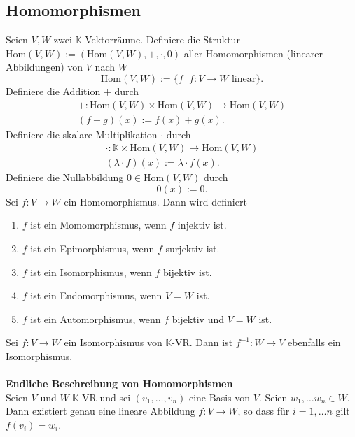 \documentclass[a4paper,12pt]{article}
\begin{document}
\subsection{Homomorphismen}
Seien $V,W$ zwei $\mathbb{K}$-Vektorräume. Definiere die Struktur $\text{Hom}\left(V,W\right):=\left(\text{Hom}\left(V,W\right),+,\cdot ,0\right)$ aller Homomorphismen (linearer Abbildungen) von $V$ nach $W$
\[ 
        \text{Hom}\left(V,W\right):=\{f\,|\, f:V\rightarrow W\text{ linear}\}
.\] 
Definiere die Addition $+$ durch
\begin{gather*}
        +:\text{Hom}\left(V,W\right)\times \text{Hom}\left(V,W\right)\rightarrow \text{Hom}\left(V,W\right)\\
        \left(f+g\right)\left(x\right):=f\left(x\right)+g\left(x\right)
.\end{gather*}
Definiere die skalare Multiplikation $\cdot $ durch
\begin{gather*}
        \cdot :\mathbb{K}\times \text{Hom}\left(V,W\right)\rightarrow \text{Hom}\left(V,W\right)\\
        \left(\lambda \cdot f\right)\left(x\right):=\lambda \cdot f\left(x\right)
.\end{gather*}
Definiere die Nullabbildung $0 \in \text{Hom}\left(V,W\right)$ durch
\[ 
        0\left(x\right):=0
.\] 
Sei $f:V\rightarrow W$ ein Homomorphismus. Dann wird definiert
\begin{enumerate}[label=\arabic*]
        \item $f$ ist ein Momomorphismus, wenn $f$ injektiv ist.
        \item $f$ ist ein Epimorphismus, wenn $f$ surjektiv ist.
        \item $f$ ist ein Isomorphismus, wenn $f$ bijektiv ist.
        \item $f$ ist ein Endomorphismus, wenn $V=W$ ist.
        \item $f$ ist ein Automorphismus, wenn $f$ bijektiv und $V=W$ ist.
\end{enumerate}
Sei $f:V\rightarrow W$ ein Isomorphismus von $\mathbb{K}$-VR. Dann ist $f^{-1}:W\rightarrow V$ ebenfalls ein Isomorphismus.
\\\hfill\\\textbf{Endliche Beschreibung von Homomorphismen}\\ 
Seien $V$ und $W$ $\mathbb{K}$-VR und sei $\left(v_1,\hdots ,v_n\right)$ eine Basis von $V$. Seien $w_1,\hdots w_n  \in W$. Dann existiert genau eine lineare Abbildung $f:V\rightarrow W$, so dass für $i=1,\hdots n$ gilt $f\left(v_i\right)=w_i$.
\end{document}
